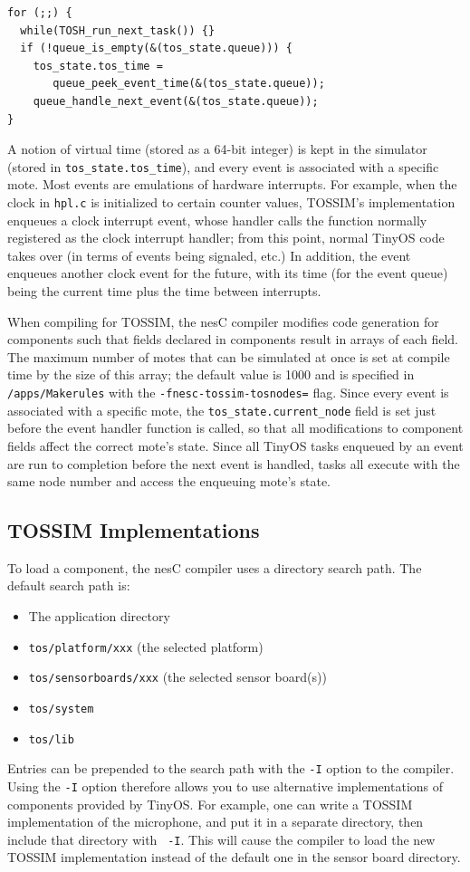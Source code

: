\documentclass[10pt,fleqn]{article}
\def\sim{TOSSIM\xspace}
\begin{document}
\begin{verbatim}
for (;;) {
  while(TOSH_run_next_task()) {}
  if (!queue_is_empty(&(tos_state.queue))) {	
    tos_state.tos_time =
       queue_peek_event_time(&(tos_state.queue));
    queue_handle_next_event(&(tos_state.queue));
}
\end{verbatim}


A notion of virtual time (stored as a 64-bit integer) is kept in the
simulator (stored in {\tt tos\_state.tos\_time}), and every event is
associated with a specific mote. Most events are emulations of
hardware interrupts. For example, when the clock in {\tt hpl.c} is
initialized to certain counter values, \sim's implementation
enqueues a clock interrupt event, whose handler calls the function
normally registered as the clock interrupt handler; from this point,
normal TinyOS code takes over (in terms of events being signaled,
etc.) In addition, the event enqueues another clock event for the
future, with its time (for the event queue) being the current time
plus the time between interrupts.

When compiling for \sim, the nesC compiler modifies code generation
for components such that fields declared in components result in
arrays of each field.  The maximum number of motes that can be
simulated at once is set at compile time by the size of this array;
the default value is 1000 and is specified in {\tt /apps/Makerules}
with the {\tt -fnesc-tossim-tosnodes=} flag. Since every event is
associated with a specific mote, the {\tt tos\_state.current\_node}
field is set just before the event handler function is called, so that
all modifications to component fields affect the correct mote's
state. Since all TinyOS tasks enqueued by an event are run to
completion before the next event is handled, tasks all execute with
the same node number and access the enqueuing mote's state.

\subsection{\sim Implementations}

To load a component, the nesC compiler uses a directory search
path. The default search path is:

\begin{itemize}
\item The application directory
\item {\tt tos/platform/xxx} (the selected platform)
\item {\tt tos/sensorboards/xxx} (the selected sensor board(s))
\item {\tt tos/system}
\item {\tt tos/lib}
\end{itemize}
Entries can be prepended to the search path with the {\tt -I} option
to the compiler. Using the {\tt -I} option therefore allows you to use
alternative implementations of components provided by TinyOS. For
example, one can write a \sim implementation of the microphone, and
put it in a separate directory, then include that directory with {\tt
-I}. This will cause the compiler to load the new \sim implementation
instead of the default one in the sensor board directory.
\end{document}
